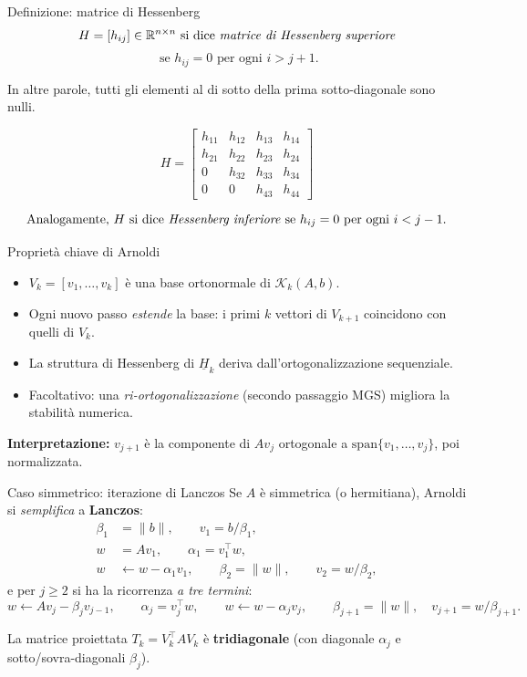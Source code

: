 \documentclass{beamer}
\begin{document}
\begin{frame}{Definizione: matrice di Hessenberg}
\[
H = [h_{ij}] \in \mathbb{R}^{n \times n} \text{ si dice \emph{matrice di Hessenberg superiore}} 
\]
\[
\text{ se } h_{ij} = 0 \text{ per ogni } i > j + 1.
\]

In altre parole, tutti gli elementi al di sotto della prima sotto-diagonale sono nulli.

\[
H =
\begin{bmatrix}
h_{11} & h_{12} & h_{13} & h_{14} \\
h_{21} & h_{22} & h_{23} & h_{24} \\
0      & h_{32} & h_{33} & h_{34} \\
0      & 0      & h_{43} & h_{44}
\end{bmatrix}
\]

\[
\text{Analogamente, } H \text{ si dice \emph{Hessenberg inferiore} se } h_{ij} = 0 \text{ per ogni } i < j - 1.
\]


\end{frame}

\begin{frame}{Proprietà chiave di Arnoldi}
\begin{itemize}
  \item $V_k=[v_1,\dots,v_k]$ è una base ortonormale di $\mathcal{K}_k(A,b)$.
  \item Ogni nuovo passo \emph{estende} la base: i primi $k$ vettori di $V_{k+1}$ coincidono con quelli di $V_k$.
  \item La struttura di Hessenberg di $\underline H_k$ deriva dall'ortogonalizzazione sequenziale.
  \item Facoltativo: una \emph{ri-ortogonalizzazione} (secondo passaggio MGS) migliora la stabilità numerica.
\end{itemize}

\medskip
\textbf{Interpretazione:} $v_{j+1}$ è la componente di $A v_j$ ortogonale a $\mathrm{span}\{v_1,\dots,v_j\}$, poi normalizzata.
\end{frame}

\begin{frame}{Caso simmetrico: iterazione di Lanczos}
Se $A$ è simmetrica (o hermitiana), Arnoldi si \emph{semplifica} a \textbf{Lanczos}:
\begin{align*}
\beta_1 &= \|b\|, \qquad v_1 = b/\beta_1,\\
w &= A v_1,\qquad \alpha_1 = v_1^\top w,\\
w &\leftarrow w - \alpha_1 v_1,\qquad \beta_2=\|w\|,\qquad v_2=w/\beta_2,
\end{align*}
e per $j\ge 2$ si ha la ricorrenza \emph{a tre termini}:
\[
w \leftarrow A v_j - \beta_j v_{j-1},\qquad
\alpha_j = v_j^\top w,\qquad
w \leftarrow w - \alpha_j v_j,\qquad
\beta_{j+1}=\|w\|,\quad v_{j+1}=w/\beta_{j+1}.
\]

\medskip
La matrice proiettata $T_k = V_k^\top A V_k$ è \textbf{tridiagonale} (con diagonale $\alpha_j$ e sotto/sovra-diagonali $\beta_j$).
\end{frame}
\end{document}

